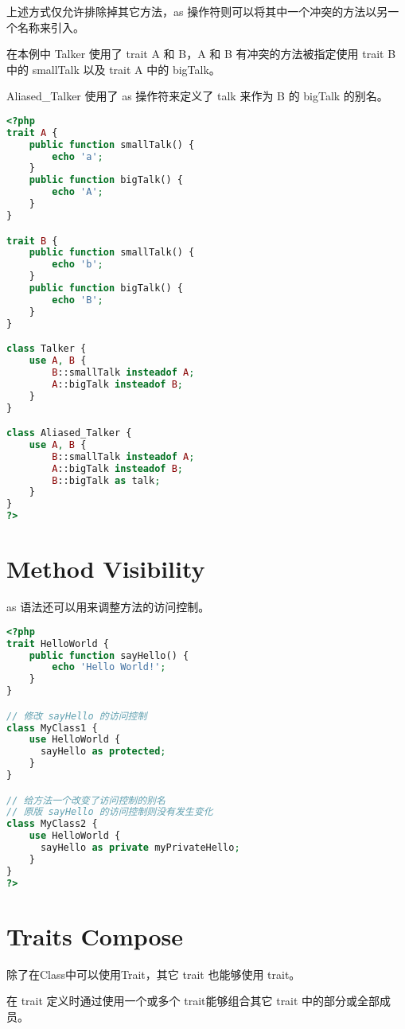 上述方式仅允许排除掉其它方法，as 操作符则可以将其中一个冲突的方法以另一个名称来引入。

在本例中 Talker 使用了 trait A 和 B，A 和 B 有冲突的方法被指定使用 trait B 中的 smallTalk 以及 trait A 中的 bigTalk。

Aliased\_Talker 使用了 as 操作符来定义了 talk 来作为 B 的 bigTalk 的别名。

\begin{lstlisting}[language=PHP]
<?php
trait A {
    public function smallTalk() {
        echo 'a';
    }
    public function bigTalk() {
        echo 'A';
    }
}

trait B {
    public function smallTalk() {
        echo 'b';
    }
    public function bigTalk() {
        echo 'B';
    }
}

class Talker {
    use A, B {
        B::smallTalk insteadof A;
        A::bigTalk insteadof B;
    }
}

class Aliased_Talker {
    use A, B {
        B::smallTalk insteadof A;
        A::bigTalk insteadof B;
        B::bigTalk as talk;
    }
}
?>
\end{lstlisting}




\section{Method Visibility}

as 语法还可以用来调整方法的访问控制。

\begin{lstlisting}[language=PHP]
<?php
trait HelloWorld {
    public function sayHello() {
        echo 'Hello World!';
    }
}

// 修改 sayHello 的访问控制
class MyClass1 {
    use HelloWorld { 
      sayHello as protected;
    }
}

// 给方法一个改变了访问控制的别名
// 原版 sayHello 的访问控制则没有发生变化
class MyClass2 {
    use HelloWorld { 
      sayHello as private myPrivateHello; 
    }
}
?>
\end{lstlisting}




\section{Traits Compose}

除了在Class中可以使用Trait，其它 trait 也能够使用 trait。

在 trait 定义时通过使用一个或多个 trait能够组合其它 trait 中的部分或全部成员。

